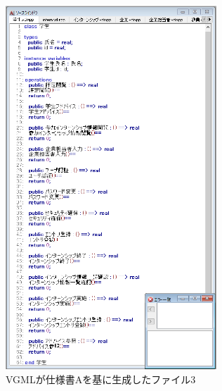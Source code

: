 \begin{figure}[p]
    \begin{center}
    \includegraphics[width=300]{image/indication_vdm3.PNG}
    \caption{VGMLが仕様書Aを基に生成したファイル3}
    \label{fig:indication_vdm3}
    \end{center}
\end{figure}

